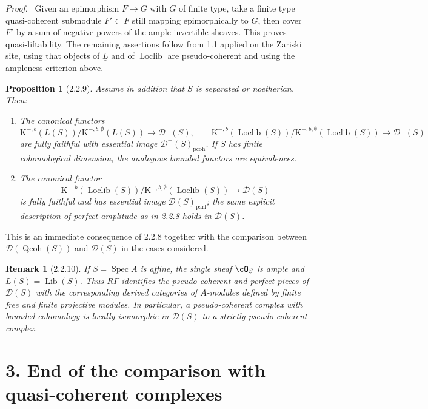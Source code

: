 \documentclass[11pt]{article}
\theoremstyle{plain}
\newtheorem*{proposition*}{Proposition}
\newtheorem*{remark*}{Remark}
\theoremstyle{definition}
\theoremstyle{remark}
\newenvironment{prooftext}{\par\noindent\textit{Proof.}\ }{\par\medskip}
\newcommand{\D}{\mathcal D}\newcommand{\E}{\mathcal E}\newcommand{\F}{\mathcal F}
\DeclareMathOperator{\Spec}{Spec}
\providecommand{\K}{\mathrm K}
\providecommand{\Qcoh}{\operatorname{Qcoh}}
\providecommand{\Loclib}{\operatorname{Loclib}}
\providecommand{\Lib}{\operatorname{Lib}}
\begin{document}
\begin{prooftext}
Given an epimorphism $F\to G$ with $G$ of finite type, take a finite type quasi-coherent submodule $F'\subset F$ still mapping epimorphically to $G$, then cover $F'$ by a sum of negative powers of the ample invertible sheaves. This proves quasi-liftability. The remaining assertions follow from 1.1 applied on the Zariski site, using that objects of $\underline L$ and of $\Loclib$ are pseudo-coherent and using the ampleness criterion above.
\end{prooftext}

\begin{proposition*}[2.2.9]
Assume in addition that $S$ is separated or noetherian. Then:
\begin{enumerate}[label=\alph*)]
\item The canonical functors
\[
\K^{-,b}(\underline L(S))/\K^{-,b,\emptyset}(\underline L(S))\to\D^-(S),
\qquad
\K^{-,b}(\Loclib(S))/\K^{-,b,\emptyset}(\Loclib(S))\to\D^-(S)
\]
are fully faithful with essential image $\D^-(S)_{\mathrm{pcoh}}$. If $S$ has finite cohomological dimension, the analogous bounded functors are equivalences.
\item The canonical functor
\[
\K^{-,b}(\Loclib(S))/\K^{-,b,\emptyset}(\Loclib(S))\to\D(S)
\]
is fully faithful and has essential image $\D(S)_{\mathrm{parf}}$; the same explicit description of perfect amplitude as in 2.2.8 holds in $\D(S)$.
\end{enumerate}
\end{proposition*}

This is an immediate consequence of 2.2.8 together with the comparison between $\D(\Qcoh(S))$ and $\D(S)$ in the cases considered.

\begin{remark*}[2.2.10]
If $S=\Spec A$ is affine, the single sheaf $\cO_S$ is ample and $\underline L(S)=\Lib(S)$. Thus $R\Gamma$ identifies the pseudo-coherent and perfect pieces of $\D(S)$ with the corresponding derived categories of $A$-modules defined by finite free and finite projective modules. In particular, a pseudo-coherent complex with bounded cohomology is locally isomorphic in $\D(S)$ to a strictly pseudo-coherent complex.
\end{remark*}

\section*{3. End of the comparison with quasi-coherent complexes}
\end{document}
